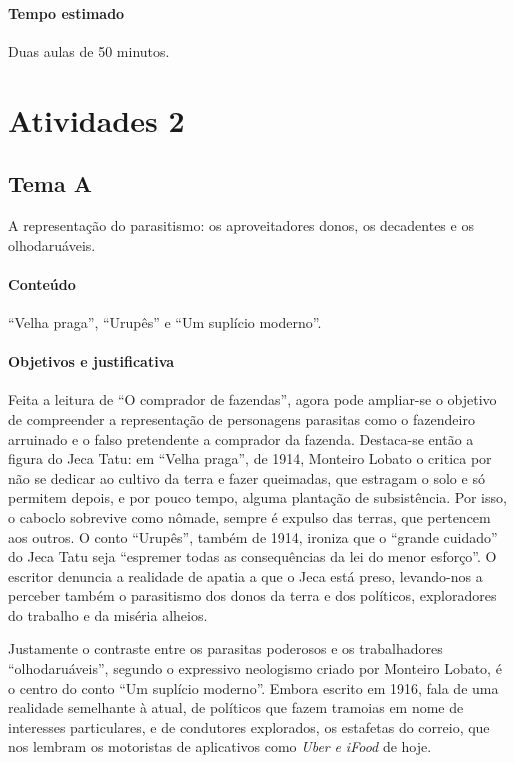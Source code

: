 \documentclass[12pt]{extarticle}
\begin{document}
\paragraph{Tempo estimado} Duas aulas de 50 minutos.


\section{Atividades 2}

\subsection{Tema A}

A representação do parasitismo: os aproveitadores donos, os decadentes e
os olhodaruáveis.


\paragraph{Conteúdo} ``Velha praga'', ``Urupês'' e ``Um suplício moderno''.

\paragraph{Objetivos e justificativa}
Feita a leitura de ``O comprador de fazendas'', agora pode ampliar-se o
objetivo de compreender a representação de personagens parasitas como o
fazendeiro arruinado e o falso pretendente a comprador da fazenda.
Destaca-se então a figura do Jeca Tatu: em ``Velha praga'', de 1914,
Monteiro Lobato o critica por não se dedicar ao cultivo da terra e fazer
queimadas, que estragam o solo e só permitem depois, e por pouco tempo,
alguma plantação de subsistência. Por isso, o caboclo sobrevive como
nômade, sempre é expulso das terras, que pertencem aos outros. O conto
``Urupês'', também de 1914, ironiza que o ``grande cuidado'' do Jeca
Tatu seja ``espremer todas as consequências da lei do menor esforço''. O
escritor denuncia a realidade de apatia a que o Jeca está preso,
levando-nos a perceber também o parasitismo dos donos da terra e dos
políticos, exploradores do trabalho e da miséria alheios.

Justamente o contraste entre os parasitas poderosos e os trabalhadores
``olhodaruáveis'', segundo o expressivo neologismo criado por Monteiro
Lobato, é o centro do conto ``Um suplício moderno''. Embora escrito em
1916, fala de uma realidade semelhante à atual, de políticos que fazem
tramoias em nome de interesses particulares, e de condutores explorados,
os estafetas do correio, que nos lembram os motoristas de aplicativos
como \emph{Uber} \emph{e iFood} de hoje.
\end{document}
